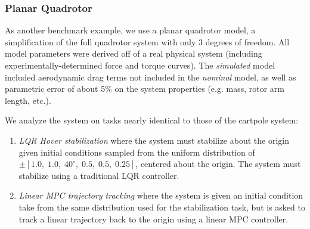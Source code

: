 \documentclass{article}
\begin{document}
\subsubsection{Planar Quadrotor}
As another benchmark example, we use a planar quadrotor model, a simplification of the
full quadrotor system with only 3 degrees of freedom. All model parameters were derived off 
of a real physical system (including experimentally-determined force and torque curves). 
The \textit{simulated} model included aerodynamic drag terms not included in the 
\textit{nominal} model, as well as parametric error of about 5\% on the system properties 
(e.g. mass, rotor arm length, etc.).

We analyze the system on tasks nearly identical to those of the cartpole system:
\begin{enumerate}
  \item \textit{LQR Hover stabilization} where the system must stabilize about the origin 
  given initial conditions sampled from the uniform distribution of $\pm[1.0,\; 1.0,\;
  40^\circ,\; 0.5,\; 0.5,\; 0.25]$, centered about the origin. The system must stabilize 
  using a traditional LQR controller.
  
  \item \textit{Linear MPC trajectory tracking} where the system is given an initial condition
  take from the same distribution used for the stabilization task, but is asked to track a
  linear trajectory back to the origin using a linear MPC controller.
\end{enumerate}

\end{document}
